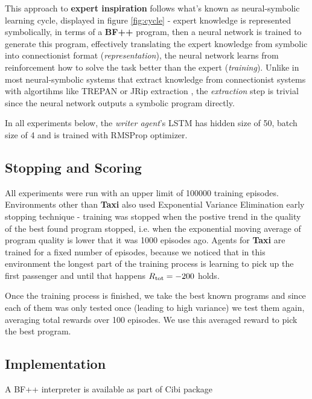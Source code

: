 This approach to \textbf{expert inspiration} follows what's known as neural-symbolic learning cycle, displayed in figure \ref{fig:cycle} - expert knowledge is represented symbolically, in terms of a \textbf{BF++} program, then a neural network is trained to generate this program, effectively translating the expert knowledge from symbolic into connectionist format (\emph{representation}), the neural network learns from reinforcement how to solve the task better than the expert (\emph{training}).
Unlike in most neural-symbolic systems \cite{neuralsymbolic} that extract knowledge from connectionist systems with algortihms like TREPAN \cite{trepan} or JRip extraction \cite{jripextr}, the \emph{extraction} step is trivial since the neural network outputs a symbolic program directly.

In all experiments below, the \emph{writer agent}'s LSTM has hidden size of 50, batch size of 4 and is trained with RMSProp \cite{tielemanLectureRmsPropDivide2012} optimizer.

\subsection{Stopping and Scoring}

All experiments were run with an upper limit of 100000 training episodes.
Environments other than \textbf{Taxi} also used Exponential Variance Elimination \cite{evestop} early stopping technique - training was stopped when the postive trend in the quality of the best found program stopped, i.e. when the exponential moving average of program quality is lower that it was 1000 episodes ago.
Agents for \textbf{Taxi} are trained for a fixed number of episodes, because we noticed that in this environment the longest part of the training process is learning to pick up the first passenger and until that happens $R_\text{tot}=-200$ holds.

Once the training process is finished, we take the best known programs and since each of them was only tested once (leading to high variance) we test them again, averaging total rewards over 100 episodes. 
We use this averaged reward to pick the best program.

\subsection{Implementation}

\begin{remark}
    A BF++ interpreter is available as part of Cibi \cite{liventsevVadim0x60Cibi2024} package
\end{remark}

